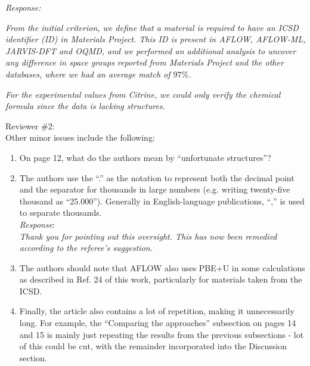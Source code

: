 \documentclass[11pt, a4paper]{letter} %
\begin{document}
\textit{Response:}

\textit{From the initial criterion, we define that a material is required to have an ICSD identifier (ID) in Materials Project. This ID is present in AFLOW, AFLOW-ML, JARVIS-DFT and OQMD, and we performed an additional analysis to uncover any difference in space groups reported from Materials Project and the other databases, where we had an average match of $97\%$.}

\textit{For the experimental values from Citrine, we could only verify the chemical formula since the data is lacking structures.}

Reviewer \#2: \\
Other minor issues include the following: 

\begin{enumerate}
    \item On page 12, what do the authors mean by “unfortunate structures”? 
    \item The authors use the “.” as the notation to represent both the decimal point and the separator for thousands in large numbers (e.g. writing twenty-five thousand as “25.000”). Generally in English-language publications, “,” is used to separate thousands. \\ 
    \textit{Response}: \\
    \textit{Thank you for pointing out this oversight. This has now been remedied according to the referee's suggestion. } 
    \item The authors should note that AFLOW also uses PBE+U in some calculations as described in Ref. 24 of this work, particularly for materials taken from the ICSD. 
    \item Finally, the article also contains a lot of repetition, making it unnecessarily long. For example, the “Comparing the approaches” subsection on pages 14 and 15 is mainly just repeating the results from the previous subsections - lot of this could be cut, with the remainder incorporated into the Discussion section. 
\end{enumerate}
\end{document}
